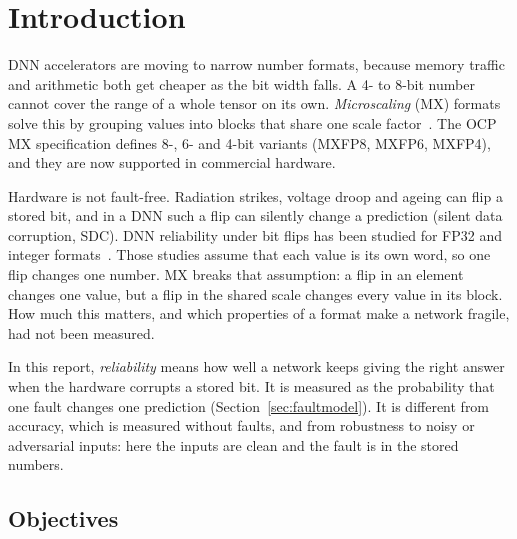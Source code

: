 \documentclass[12pt,a4paper]{article}
\begin{document}
\newpage
\tableofcontents
\newpage

\section{Introduction}

DNN accelerators are moving to narrow number formats, because memory traffic and arithmetic
both get cheaper as the bit width falls. A 4- to 8-bit number cannot cover the range of a whole
tensor on its own. \emph{Microscaling} (MX) formats solve this by grouping values into blocks
that share one scale factor~\cite{rouhani2023mx,ocp2023mx}. The OCP MX specification defines
8-, 6- and 4-bit variants (MXFP8, MXFP6, MXFP4), and they are now supported in commercial
hardware.

Hardware is not fault-free. Radiation strikes, voltage droop and ageing can flip a stored bit,
and in a DNN such a flip can silently change a prediction (silent data corruption, SDC). DNN
reliability under bit flips has been studied for FP32 and integer
formats~\cite{li2017understanding,reagen2018ares,mahmoud2020pytorchfi}. Those studies assume
that each value is its own word, so one flip changes one number. MX breaks that assumption: a
flip in an element changes one value, but a flip in the shared scale changes every value in
its block. How much this matters, and which properties of a format make a network fragile, had
not been measured.

In this report, \emph{reliability} means how well a network keeps giving the right answer when
the hardware corrupts a stored bit. It is measured as the probability that one fault changes
one prediction (Section~\ref{sec:faultmodel}). It is different from accuracy, which is
measured without faults, and from robustness to noisy or adversarial inputs: here the inputs
are clean and the fault is in the stored numbers.

\subsection{Objectives}
\end{document}
